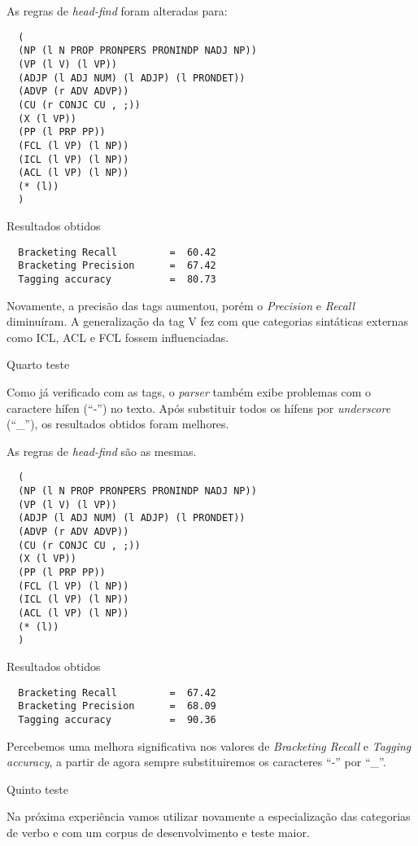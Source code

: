 As regras de \emph{head-find} foram alteradas para:

\scriptsize
\begin{verbatim}
  (
  (NP (l N PROP PRONPERS PRONINDP NADJ NP))
  (VP (l V) (l VP))
  (ADJP (l ADJ NUM) (l ADJP) (l PRONDET))
  (ADVP (r ADV ADVP))
  (CU (r CONJC CU , ;))
  (X (l VP))
  (PP (l PRP PP))
  (FCL (l VP) (l NP))
  (ICL (l VP) (l NP))
  (ACL (l VP) (l NP))
  (* (l))
  )
\end{verbatim}

Resultados obtidos


\begin{verbatim}
  Bracketing Recall         =  60.42
  Bracketing Precision      =  67.42
  Tagging accuracy          =  80.73
\end{verbatim}

\normalsize
Novamente, a precisão das tags aumentou, porém o \emph{Precision} e \emph{Recall} diminuíram. A generalização da tag V fez com que categorias sintáticas externas como ICL, ACL e FCL fossem influenciadas.

Quarto teste

Como já verificado com as tags, o \emph{parser} também exibe problemas com o caractere hífen (``{-}'') no texto. Após substituir todos os hífens por \emph{underscore} (``\_''), os resultados obtidos foram melhores.

As regras de \emph{head-find} são as mesmas.

\scriptsize
\begin{verbatim}
  (
  (NP (l N PROP PRONPERS PRONINDP NADJ NP))
  (VP (l V) (l VP))
  (ADJP (l ADJ NUM) (l ADJP) (l PRONDET))
  (ADVP (r ADV ADVP))
  (CU (r CONJC CU , ;))
  (X (l VP))
  (PP (l PRP PP))
  (FCL (l VP) (l NP))
  (ICL (l VP) (l NP))
  (ACL (l VP) (l NP))
  (* (l))
  )
\end{verbatim}

Resultados obtidos

\begin{verbatim}
  Bracketing Recall         =  67.42
  Bracketing Precision      =  68.09
  Tagging accuracy          =  90.36
\end{verbatim}

\normalsize

Percebemos uma melhora significativa nos valores de \emph{Bracketing Recall} e \emph{Tagging accuracy}, a partir de agora sempre substituiremos os caracteres ``{-}'' por ``\_''.

Quinto teste

Na próxima experiência vamos utilizar novamente a especialização das categorias de verbo e com um corpus de desenvolvimento e teste maior.

